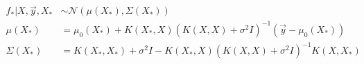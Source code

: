 \documentclass{IOS-Book-Article}
\begin{document}
\begin{equation} \label{eq:predictive_posterior}
	\begin{aligned}
		f_*|X,\vec{y},X_* & \sim \mathcal{N}(\mu(X_*), \Sigma(X_*)) \\
		\mu(X_*) & = \mu_0(X_*) + K(X_*,X)(K(X,X) + \sigma^2 I)^{-1}(\vec{y} - \mu_0(X_*)) \\
		\Sigma(X_*) & = K(X_*,X_*) + \sigma^2 I - K(X_*,X)(K(X,X) + \sigma^2 I)^{-1} K(X,X_*)
	\end{aligned}
\end{equation}	


\end{document}
